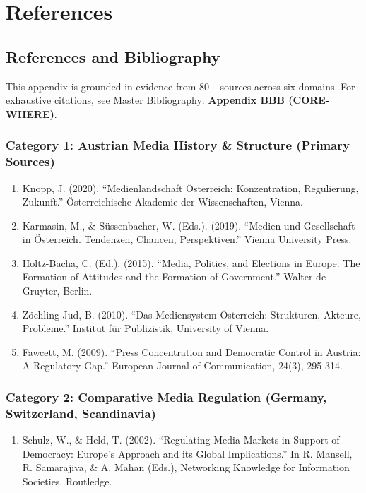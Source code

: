 {\section*{References}

\subsection*{References and Bibliography}

This appendix is grounded in evidence from 80+ sources across six domains.
For exhaustive citations, see Master Bibliography: \textbf{Appendix BBB (CORE-WHERE)}.

\subsubsection*{Category 1: Austrian Media History \& Structure (Primary Sources)}

\begin{enumerate}
\item Knopp, J. (2020). ``Medienlandschaft Österreich: Konzentration, Regulierung, Zukunft.''
  Österreichische Akademie der Wissenschaften, Vienna.

\item Karmasin, M., \& Süssenbacher, W. (Eds.). (2019). ``Medien und Gesellschaft in Österreich.
  Tendenzen, Chancen, Perspektiven.'' Vienna University Press.

\item Holtz-Bacha, C. (Ed.). (2015). ``Media, Politics, and Elections in Europe: The Formation of
  Attitudes and the Formation of Government.'' Walter de Gruyter, Berlin.

\item Zöchling-Jud, B. (2010). ``Das Mediensystem Österreich: Strukturen, Akteure, Probleme.''
  Institut für Publizistik, University of Vienna.

\item Fawcett, M. (2009). ``Press Concentration and Democratic Control in Austria: A Regulatory Gap.''
  European Journal of Communication, 24(3), 295-314.
\end{enumerate}

\subsubsection*{Category 2: Comparative Media Regulation (Germany, Switzerland, Scandinavia)}

\begin{enumerate}
\item Schulz, W., \& Held, T. (2002). ``Regulating Media Markets in Support of Democracy: Europe's
  Approach and its Global Implications.'' In R. Mansell, R. Samarajiva, \& A. Mahan (Eds.),
  Networking Knowledge for Information Societies. Routledge.


\end{enumerate}}

